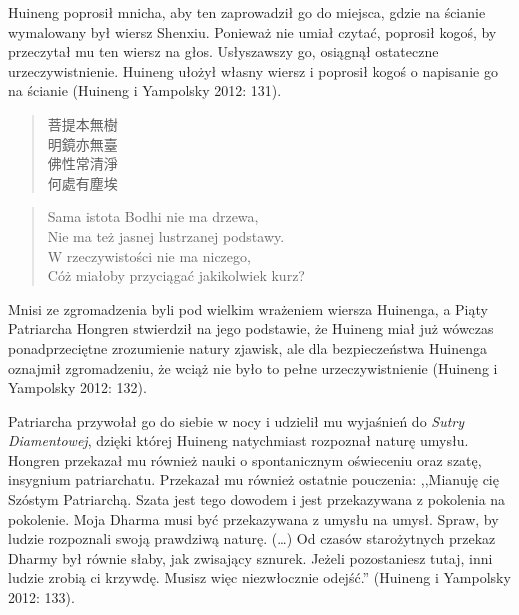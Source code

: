 Huineng poprosił mnicha, aby ten zaprowadził go do miejsca, gdzie na ścianie wymalowany był wiersz Shenxiu. Ponieważ nie umiał czytać, poprosił kogoś, by przeczytał mu ten wiersz na głos. Usłyszawszy go, osiągnął ostateczne urzeczywistnienie. Huineng ułożył własny wiersz i poprosił kogoś o napisanie go na ścianie (Huineng i Yampolsky 2012: 131).

\begin{minipage}[t]{0.4\textwidth}
\begin{verse}
菩提本無樹\\
明鏡亦無臺\\
佛性常清淨\\
何處有塵埃
\end{verse}
\end{minipage}
\begin{minipage}[t]{0.6\textwidth}
\itshape
\begin{verse}
Sama istota Bodhi nie ma drzewa,\\
Nie ma też jasnej lustrzanej podstawy.\\
W rzeczywistości nie ma niczego,\\
Cóż miałoby przyciągać jakikolwiek kurz?
\end{verse}
\end{minipage}
\label{HuinengVerse}
\vspace*{6pt}

Mnisi ze zgromadzenia byli pod wielkim wrażeniem wiersza Huinenga, a Piąty Patriarcha Hongren stwierdził na jego podstawie, że Huineng miał już wówczas ponadprzeciętne zrozumienie natury zjawisk, ale dla bezpieczeństwa Huinenga oznajmił zgromadzeniu, że wciąż nie było to pełne urzeczywistnienie (Huineng i Yampolsky 2012: 132).

Patriarcha przywołał go do siebie w nocy i udzielił mu wyjaśnień do \textit{Sutry Diamentowej}, dzięki której Huineng natychmiast rozpoznał naturę umysłu. Hongren przekazał mu również nauki o spontanicznym oświeceniu oraz szatę, insygnium patriarchatu. Przekazał mu również ostatnie pouczenia: ,,Mianuję cię Szóstym Patriarchą. Szata jest tego dowodem i jest przekazywana z pokolenia na pokolenie. Moja Dharma musi być przekazywana z umysłu na umysł. Spraw, by ludzie rozpoznali swoją prawdziwą naturę. (\ldots) Od czasów starożytnych przekaz Dharmy był równie słaby, jak zwisający sznurek. Jeżeli pozostaniesz tutaj, inni ludzie zrobią ci krzywdę. Musisz więc niezwłocznie odejść.'' (Huineng i Yampolsky 2012: 133).

